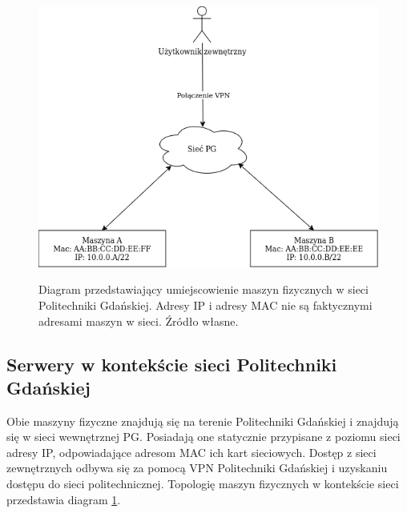 \begin{figure}[!h]
	\begin{center}
		\resizebox{0.7\textwidth}{!} {
			\includegraphics{img/4/fizycznaSiec.png}
		}
		\caption[Diagram fizycznego rozmieszczenia maszyn w sieci Politechniki Gdańskiej]{Diagram przedstawiający umiejscowienie maszyn fizycznych w sieci Politechniki Gdańskiej. Adresy IP i adresy MAC nie są faktycznymi adresami maszyn w sieci. Źródło własne.}
		\label{diagramSiecFizyczna}
	\end{center}
\end{figure}

\subsection{Serwery w kontekście sieci Politechniki Gdańskiej}
Obie maszyny fizyczne znajdują się na terenie Politechniki Gdańskiej i znajdują się w sieci wewnętrznej PG. Posiadają one statycznie przypisane z poziomu sieci adresy IP, odpowiadające adresom MAC ich kart sieciowych. Dostęp z sieci zewnętrznych odbywa się za pomocą VPN Politechniki Gdańskiej i uzyskaniu dostępu do sieci politechnicznej. Topologię maszyn fizycznych w kontekście sieci przedstawia diagram \ref{diagramSiecFizyczna}.


